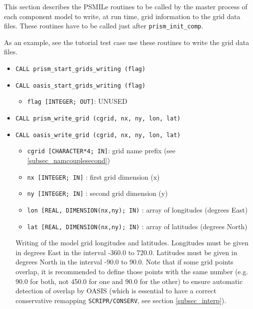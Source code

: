 This section describes the PSMILe routines to be called by the
master process of each component model to write, at run time,
grid information to the grid data files. These routines have to
be called just after {\tt prism\_init\_comp}.

As an example, see the tutorial test case
use these routines to write the grid data
files.


\begin{itemize}
  
\item {\tt CALL  prism\_start\_grids\_writing (flag)}
\item {\tt CALL  oasis\_start\_grids\_writing (flag)}
        
  \begin{itemize}
    \item {\tt flag [INTEGER; OUT]}:  UNUSED
  \end{itemize}

\item {\tt CALL prism\_write\_grid (cgrid, nx, ny, lon, lat)}
\item {\tt CALL oasis\_write\_grid (cgrid, nx, ny, lon, lat)}
        
 \begin{itemize}
    \item {\tt cgrid [CHARACTER*4; IN]}: grid name prefix (see
    \ref{subsec_namcouplesecond})
    \item {\tt nx [INTEGER; IN]} : first grid dimension (x)
    \item {\tt ny [INTEGER; IN]} : second grid dimension (y)
    \item {\tt lon [REAL, DIMENSION(nx,ny); IN)} : array of longitudes
      (degrees East) 
    \item {\tt lat [REAL, DIMENSION(nx,ny); IN)} : array of latitudes
    (degrees North)
 \end{itemize}

 Writing of the model grid longitudes and latitudes. Longitudes must
 be given in degrees East in the interval -360.0 to 720.0. Latitudes
 must be given in degrees North in the interval -90.0 to 90.0. Note
 that if some grid points overlap, it is recommended to define those
 points with the same number (e.g. 90.0 for both, not 450.0 for one
 and 90.0 for the other) to ensure automatic detection of overlap by OASIS
 (which is essential to have a correct conservative remapping
 \texttt{SCRIPR/CONSERV}, see section \ref{subsec_interp}). 



\end{itemize}

